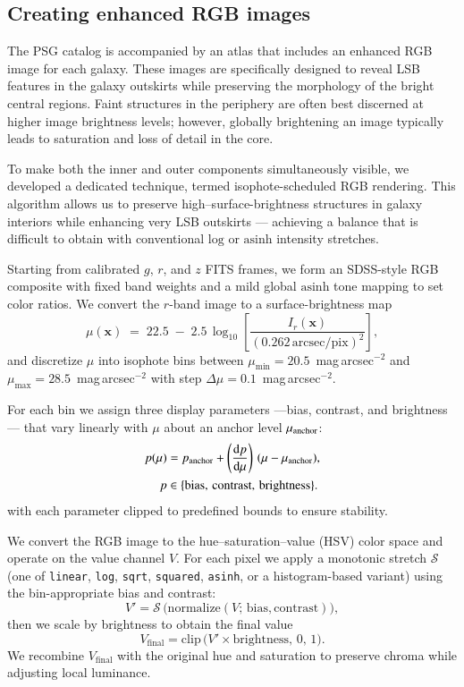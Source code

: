 \documentclass{aa}
\begin{document}
\begin{appendix}

\section{Creating enhanced RGB images} \label{app:rgb_method}

The PSG catalog is accompanied by an atlas that includes an enhanced RGB image for each galaxy. These images are specifically designed to reveal LSB features in the galaxy outskirts while preserving the morphology of the bright central regions. Faint structures in the periphery are often best discerned at higher image brightness levels; however, globally brightening an image typically leads to saturation and loss of detail in the core. 

To make both the inner and outer components simultaneously visible, we developed a dedicated technique, termed isophote-scheduled RGB rendering. This algorithm allows us to preserve high–surface-brightness structures in galaxy interiors while enhancing very LSB outskirts --- achieving a balance that is difficult to obtain with conventional $\mathrm{log}$ or $\mathrm{asinh}$ intensity stretches.

Starting from calibrated $g$, $r$, and $z$ FITS frames, we form an SDSS-style RGB composite with fixed band weights and a mild global $\mathrm{asinh}$ tone mapping to set color ratios. We convert the $r$-band image to a surface-brightness map \[
\mu(\mathbf{x}) \;=\; 22.5 \;-\; 2.5\,\log_{10}\!\left[\frac{I_r(\mathbf{x})}{\mathrm{(0.262\,arcsec/pix)}^2}\right],
\] and discretize $\mu$ into isophote bins between $\mu_{\min}=20.5$~mag\,arcsec$^{-2}$ and $\mu_{\max}=28.5$~mag\,arcsec$^{-2}$ with step $\Delta\mu=0.1$~mag\,arcsec$^{-2}$.

For each bin we assign three display parameters ---bias, contrast, and brightness --- that vary linearly with $\mu$ about an anchor level $\mu_{\rm anchor}$:
\begin{align}
p(\mu) &= p_{\rm anchor}
        + \left(\frac{\mathrm{d}p}{\mathrm{d}\mu}\right)\,(\mu - \mu_{\rm anchor}), \nonumber\\
p &\in \{\mathrm{bias,\,contrast,\,brightness}\}.
\end{align}
with each parameter clipped to predefined bounds to ensure stability.

We convert the RGB image to the hue–saturation–value (HSV) color space and operate on the value channel $V$. For each pixel we apply a monotonic stretch $\mathcal{S}$ (one of \texttt{linear}, \texttt{log}, \texttt{sqrt}, \texttt{squared}, \texttt{asinh}, or a histogram-based variant) using the bin-appropriate bias and contrast:
\[
V' = \mathcal{S}\,\bigl(\mathrm{normalize}(V;\,\mathrm{bias},\mathrm{contrast})\bigr),
\]
then we scale by brightness to obtain the final value
\[
V_{\mathrm{final}} = \mathrm{clip}\,\bigl(V'\times \mathrm{brightness},\,0,\,1\bigr).
\]
We recombine $V_{\mathrm{final}}$ with the original hue and saturation to preserve chroma while adjusting local luminance.


\end{appendix}
\end{document}
